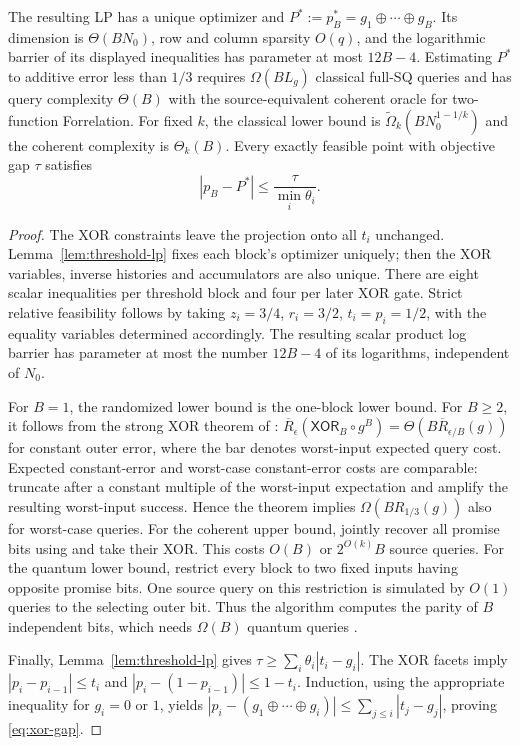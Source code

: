\begin{theorem}\label{thm:threshold-xor}
The resulting LP has a unique optimizer and
$P^*:=p_B^*=g_1\mathbin\oplus\cdots\mathbin\oplus g_B$.
Its dimension is $\Theta(BN_0)$, row and column sparsity $O(q)$,
and the logarithmic barrier of its displayed inequalities has parameter
at most $12B-4$.
Estimating $P^*$ to additive error less than $1/3$ requires
$\Omega(BL_g)$ classical full-SQ queries and has query complexity $\Theta(B)$
with the source-equivalent coherent oracle for two-function Forrelation.
For fixed $k$, the classical lower bound is $\widetilde\Omega_k(BN_0^{1-1/k})$ and the
coherent complexity is $\Theta_k(B)$.
Every exactly feasible point with objective gap $\tau$ satisfies
\begin{equation}\label{eq:xor-gap}
 |p_B-P^*|\leq\frac{\tau}{\min_i\theta_i}.
\end{equation}
\end{theorem}
\begin{proof}
The XOR constraints leave the projection onto all $t_i$ unchanged.
Lemma~\ref{lem:threshold-lp} fixes each block's optimizer uniquely;
then the XOR variables, inverse histories and accumulators are also unique.
There are eight scalar inequalities per threshold block and four per later
XOR gate.  Strict relative feasibility follows by taking $z_i=3/4$,
$r_i=3/2$, $t_i=p_i=1/2$, with the equality variables determined
accordingly.  The resulting scalar product log barrier has parameter at
most the number $12B-4$ of its logarithms, independent of $N_0$.

For $B=1$, the randomized lower bound is the one-block lower bound.
For $B\geq2$, it follows from the strong XOR theorem of
\citet[Theorem~1.1]{BrodyEtAl2023}:
$\overline R_\epsilon(\mathsf{XOR}_B\circ g^B)
=\Theta(B\overline R_{\epsilon/B}(g))$ for constant outer error,
where the bar denotes worst-input expected query cost.
Expected constant-error and worst-case constant-error costs are comparable:
truncate after a constant multiple of the worst-input expectation and
amplify the resulting worst-input success.  Hence the theorem implies
$\Omega(BR_{1/3}(g))$ also for worst-case queries.
For the coherent upper bound, jointly recover all promise bits using
\citet[Corollary~3]{BuhrmanEtAl2007} and take their XOR.  This costs
$O(B)$ or $2^{O(k)}B$ source queries.  For the quantum lower bound,
restrict every
block to two fixed inputs having opposite promise bits.  One source query
on this restriction is simulated by $O(1)$ queries to the selecting outer
bit.  Thus the algorithm computes the parity of $B$ independent bits, which
needs $\Omega(B)$ quantum queries \citep{BealsEtAl2001}.

Finally, Lemma~\ref{lem:threshold-lp} gives
$\tau\geq\sum_i\theta_i|t_i-g_i|$.  The XOR facets imply
$|p_i-p_{i-1}|\leq t_i$ and
$|p_i-(1-p_{i-1})|\leq1-t_i$.
Induction, using the appropriate inequality for $g_i=0$ or $1$, yields
$|p_i-(g_1\mathbin\oplus\cdots\mathbin\oplus g_i)|
\leq\sum_{j\leq i}|t_j-g_j|$, proving \eqref{eq:xor-gap}.
\end{proof}

